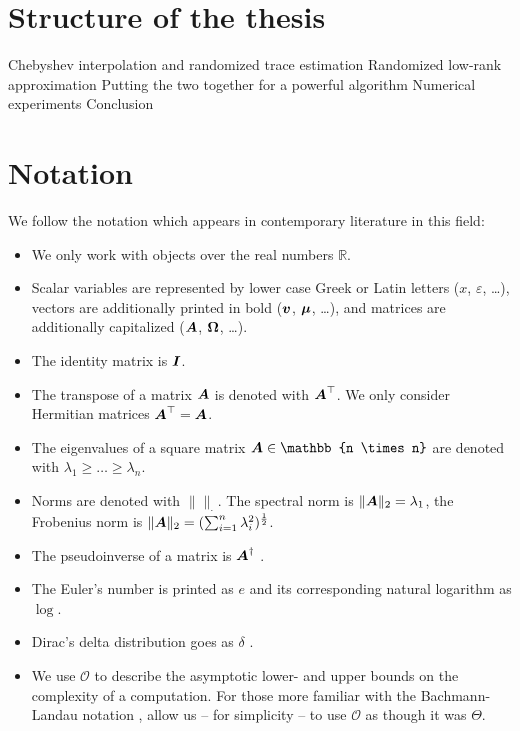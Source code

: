 
\section{Structure of the thesis}
\label{sec:1-introduction-structure}

Chebyshev interpolation and randomized trace estimation 
Randomized low-rank approximation 
Putting the two together for a powerful algorithm 
Numerical experiments 
Conclusion 


\section{Notation}
\label{sec:1-introduction-notation}

We follow the notation which appears in contemporary literature in this field:

\begin{itemize}
    \item We only work with objects over the real numbers $\mathbb{R}$.
    \item Scalar variables are represented by lower case Greek or Latin letters ($x$, $\varepsilon$, \dots),
          vectors are additionally printed in bold ($\boldsymbol{v}$, $\boldsymbol{\mu}$, \dots),
          and matrices are additionally capitalized ($\boldsymbol{A}$, $\boldsymbol{\Omega}$, \dots).
    \item The identity matrix is $\boldsymbol{I}$.
    \item The transpose of a matrix $\boldsymbol{A}$ is denoted with $\boldsymbol{A}^{\top}$.
          We only consider Hermitian matrices $\boldsymbol{A}^{\top} = \boldsymbol{A}$.
    \item The eigenvalues of a square matrix $\mtx{A} \in \mathbb{n \times n}$
          are denoted with $\lambda_1 \geq \dots \geq \lambda_n$.
    \item Norms are denoted with $\lVert \rVert _{\cdot}$. The spectral norm is
          $\lVert \boldsymbol{A} \rVert _2 = \lambda_1$, the Frobenius norm
          is $\lVert \boldsymbol{A} \rVert _2 = (\sum_{i=1}^{n} \lambda_i^2)^{\frac{1}{2}}$.
    \item The pseudoinverse of a matrix is $\boldsymbol{A}^{\dagger}$ \cite{penrose1955pseudo}.
    \item The Euler's number is printed as $e$ and its corresponding natural logarithm as $\log$.
    \item Dirac's delta distribution goes as $\delta$ \cite[Chapter~15]{dirac1947quantum}.
    \item We use $\mathcal{O}$ to describe the asymptotic lower- and upper bounds
          on the complexity of a computation. For those more familiar with the
          Bachmann-Landau notation \cite[Section~3.2]{cormen2009algorithms},
          allow us -- for simplicity -- to use $\mathcal{O}$ as though it was $\Theta$.
\end{itemize}

